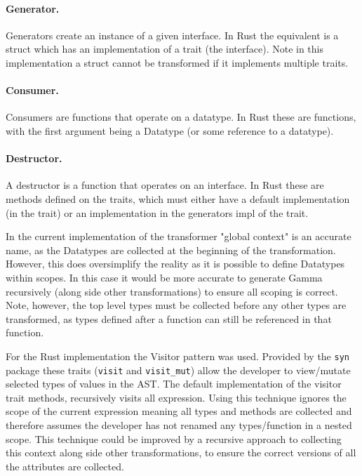 \documentclass[ oneside,%
                    author={James Elgar},
                    degree={MEng},
                     title={Bidirectional transformer between functional and \\ object-oriented programming in Rust},
                  subtitle={}]{dissertation}
\begin{document}
\paragraph{Generator.} Generators create an instance of a given interface. In Rust the equivalent is a struct which has an implementation of a trait (the interface). Note in this implementation a struct cannot be transformed if it implements multiple traits. 
\paragraph{Consumer.} Consumers are functions that operate on a datatype. In Rust these are functions, with the first argument being a Datatype (or some reference to a datatype).
\paragraph{Destructor.} A destructor is a function that operates on an interface. In Rust these are methods defined on the traits, which must either have a default implementation (in the trait) or an implementation in the generators impl of the trait.

\vspace{10pt}

In the current implementation of the transformer "global context" is an accurate name, as the Datatypes are collected at the beginning of the transformation. However, this does oversimplify the reality as it is possible to define Datatypes within scopes. In this case it would be more accurate to generate Gamma recursively (along side other transformations) to ensure all scoping is correct. Note, however, the top level types must be collected before any other types are transformed, as types defined after a function can still be referenced in that function.

For the Rust implementation the Visitor pattern was used. Provided by the \verb|syn| package these traits (\verb|visit| and \verb|visit_mut|) allow the developer to view/mutate selected types of values in the AST. The default implementation of the visitor trait methods, recursively visits all expression. Using this technique ignores the scope of the current expression meaning all types and methods are collected and therefore assumes the developer has not renamed any types/function in a nested scope. This technique could be improved by a recursive approach to collecting this context along side other transformations, to ensure the correct versions of all the attributes are collected.
\end{document}
